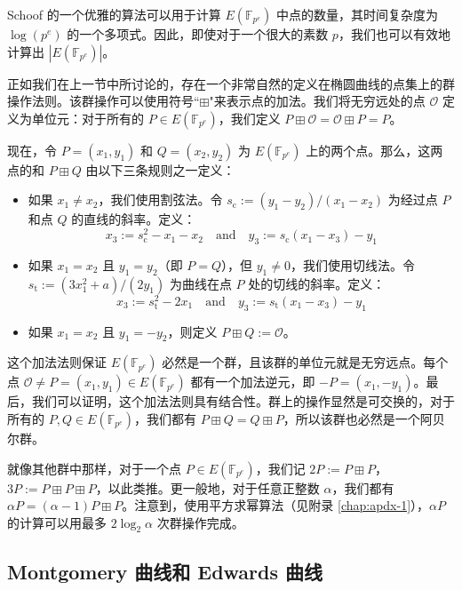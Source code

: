 \begin{remark}\label{remark:15-1}
Schoof 的一个优雅的算法可以用于计算 $E(\mathbb{F}_{p^e})$ 中点的数量，其时间复杂度为 $\log(p^e)$ 的一个多项式。因此，即使对于一个很大的素数 $p$，我们也可以有效地计算出 $|E(\mathbb{F}_{p^e})|$。
\end{remark}

\begin{snote}[加法法则。]
正如我们在上一节中所讨论的，存在一个非常自然的定义在椭圆曲线的点集上的群操作法则。该群操作可以使用符号``$\boxplus$"来表示点的加法。我们将无穷远处的点 $\mathcal{O}$ 定义为单位元：对于所有的 $P\in E(\mathbb{F}_{p^e})$，我们定义 $P\boxplus\mathcal{O}=\mathcal{O} \boxplus P=P$。

现在，令 $P=(x_1, y_1)$ 和 $Q=(x_2,y_2)$ 为 $E(\mathbb{F}_{p^e})$ 上的两个点。那么，这两点的和 $P\boxplus Q$ 由以下三条规则之一定义：
\begin{itemize}
	\item 如果 $x_1 \neq x_2$，我们使用割弦法。令 $s_\mathrm{c}:=(y_1-y_2)/(x_1-x_2)$ 为经过点 $P$ 和点 $Q$ 的直线的斜率。定义：
		\[
			x_3:=s_\mathrm{c}^2-x_1-x_2
			\quad\text{and}\quad
			y_3:=s_\mathrm{c}(x_1-x_3)-y_1
		\]
	\item 如果 $x_1=x_2$ 且 $y_1=y_2$（即 $P=Q$），但 $y_1 \neq0$，我们使用切线法。令 $s_\mathrm{t}:=(3x_1^2+a)/(2y_1)$ 为曲线在点 $P$ 处的切线的斜率。定义：
		\[
			x_3:=s_\mathrm{t}^2-2x_1
			\quad\text{and}\quad
			y_3:=s_\mathrm{t}(x_1-x_3)-y_1
		\]
	\item 如果 $x_1=x_2$ 且 $y_1=-y_2$，则定义 $P\boxplus Q:=\mathcal{O}$。
\end{itemize}
这个加法法则保证 $E(\mathbb{F}_{p^e})$ 必然是一个群，且该群的单位元就是无穷远点。每个点 $\mathcal{O}\neq P=(x_1,y_1)\in E(\mathbb{F}_{p^e})$ 都有一个加法逆元，即 $-P=(x_1,-y_1)$。最后，我们可以证明，这个加法法则具有结合性。群上的操作显然是可交换的，对于所有的 $P,Q \in E(\mathbb{F}_{p^e})$，我们都有 $P\boxplus Q=Q\boxplus P$，所以该群也必然是一个阿贝尔群。

就像其他群中那样，对于一个点 $P\in E(\mathbb{F}_{p^e})$，我们记 $2P:=P\boxplus P$，$3P:=P\boxplus P\boxplus P$，以此类推。更一般地，对于任意正整数 $\alpha$，我们都有 $\alpha P = (\alpha - 1)P \boxplus P$。注意到，使用平方求幂算法（见附录 \ref{chap:apdx-1}），$\alpha P$ 的计算可以用最多 $2\log_2\alpha$ 次群操作完成。
\end{snote}

\subsection{Montgomery 曲线和 Edwards 曲线}

